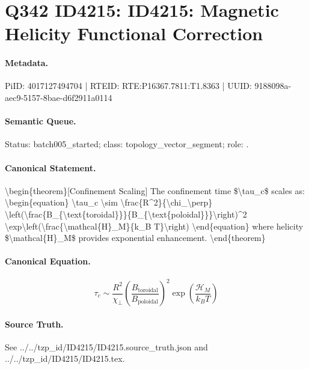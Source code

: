 \section*{Q342 ID4215: ID4215: Magnetic Helicity Functional Correction}
\paragraph{Metadata.}
PiID: 4017127494704 | RTEID: RTE:P16367.7811:T1.8363 | UUID: 9188098a-aec9-5157-8bae-d6f2911a0114

\paragraph{Semantic Queue.}
Status: batch005\_started; class: topology\_vector\_segment; role: .

\paragraph{Canonical Statement.}
\textbackslash{}begin\{theorem\}[Confinement Scaling] The confinement time \$\textbackslash{}tau\_c\$ scales as: \textbackslash{}begin\{equation\} \textbackslash{}tau\_c \textbackslash{}sim \textbackslash{}frac\{R\textasciicircum{}2\}\{\textbackslash{}chi\_\textbackslash{}perp\} \textbackslash{}left(\textbackslash{}frac\{B\_\{\textbackslash{}text\{toroidal\}\}\}\{B\_\{\textbackslash{}text\{poloidal\}\}\}\textbackslash{}right)\textasciicircum{}2 \textbackslash{}exp\textbackslash{}left(\textbackslash{}frac\{\textbackslash{}mathcal\{H\}\_M\}\{k\_B T\}\textbackslash{}right) \textbackslash{}end\{equation\} where helicity \$\textbackslash{}mathcal\{H\}\_M\$ provides exponential enhancement. \textbackslash{}end\{theorem\}

\paragraph{Canonical Equation.}
\[
\begin{equation} \tau_c \sim \frac{R^2}{\chi_\perp} \left(\frac{B_{\text{toroidal}}}{B_{\text{poloidal}}}\right)^2 \exp\left(\frac{\mathcal{H}_M}{k_B T}\right) \end{equation}
\]

\paragraph{Source Truth.}
See ../../tzp\_id/ID4215/ID4215.source\_truth.json and ../../tzp\_id/ID4215/ID4215.tex.
